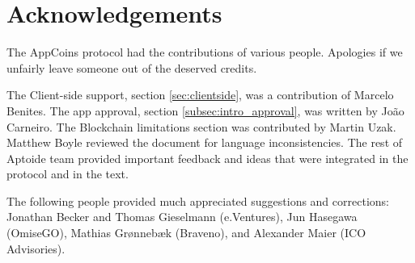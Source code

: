 \section{Acknowledgements}
\label{sec:acknowledgements}

The AppCoins protocol had the contributions of various people. Apologies if we unfairly leave someone out of the deserved credits.

The Client-side support, section \ref{sec:clientside}, was a contribution of Marcelo Benites. The app approval, section \ref{subsec:intro_approval}, was written by Jo\~ao Carneiro. The Blockchain limitations section was contributed by Martin Uzak. Matthew Boyle reviewed the document for language inconsistencies. The rest of Aptoide team provided important feedback and ideas that were integrated in the protocol and in the text.

The following people provided much appreciated suggestions and corrections: Jonathan Becker and Thomas Gieselmann (e.Ventures), Jun Hasegawa (OmiseGO), Mathias Grønnebæk (Braveno), and Alexander Maier (ICO Advisories).
